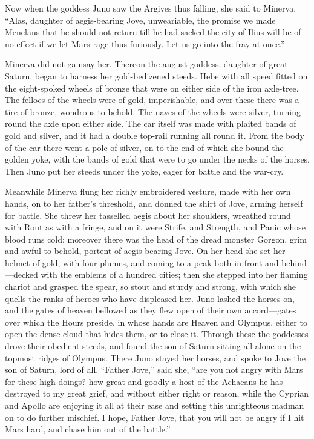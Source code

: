 Now when the goddess Juno saw the Argives thus falling, she said to
Minerva, “Alas, daughter of aegis-bearing Jove, unweariable, the promise
we made Menelaus that he should not return till he had sacked the city of
Ilius will be of no effect if we let Mars rage thus furiously. Let us go
into the fray at once.”

Minerva did not gainsay her. Thereon the august goddess, daughter of great
Saturn, began to harness her gold-bedizened steeds. Hebe with all speed
fitted on the eight-spoked wheels of bronze that were on either side of
the iron axle-tree. The felloes of the wheels were of gold, imperishable,
and over these there was a tire of bronze, wondrous to behold. The naves
of the wheels were silver, turning round the axle upon either side. The
car itself was made with plaited bands of gold and silver, and it had a
double top-rail running all round it. From the body of the car there went
a pole of silver, on to the end of which she bound the golden yoke, with
the bands of gold that were to go under the necks of the horses. Then Juno
put her steeds under the yoke, eager for battle and the war-cry.

Meanwhile Minerva flung her richly embroidered vesture, made with her own
hands, on to her father’s threshold, and donned the shirt of Jove, arming
herself for battle. She threw her tasselled aegis about her shoulders,
wreathed round with Rout as with a fringe, and on it were Strife, and
Strength, and Panic whose blood runs cold; moreover there was the head of
the dread monster Gorgon, grim and awful to behold, portent of
aegis-bearing Jove. On her head she set her helmet of gold, with four
plumes, and coming to a peak both in front and behind—decked with
the emblems of a hundred cities; then she stepped into her flaming chariot
and grasped the spear, so stout and sturdy and strong, with which she
quells the ranks of heroes who have displeased her. Juno lashed the horses
on, and the gates of heaven bellowed as they flew open of their own accord—gates
over which the Hours preside, in whose hands are Heaven and Olympus,
either to open the dense cloud that hides them, or to close it. Through
these the goddesses drove their obedient steeds, and found the son of
Saturn sitting all alone on the topmost ridges of Olympus. There Juno
stayed her horses, and spoke to Jove the son of Saturn, lord of all.
“Father Jove,” said she, “are you not angry with Mars for these high
doings? how great and goodly a host of the Achaeans he has destroyed to my
great grief, and without either right or reason, while the Cyprian and
Apollo are enjoying it all at their ease and setting this unrighteous
madman on to do further mischief. I hope, Father Jove, that you will not
be angry if I hit Mars hard, and chase him out of the battle.”

